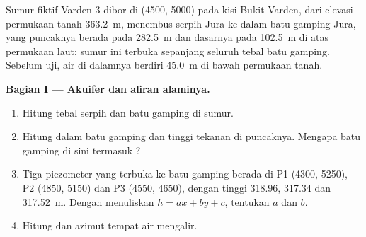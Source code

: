 \begin{problem}
\label{pb:b3:hydrogeology:1}
Sumur fiktif Varden-3 dibor di (4500, 5000) pada kisi
Bukit Varden, dari elevasi permukaan tanah \qty{363.2}{m}, menembus serpih Jura
ke dalam batu gamping Jura, yang puncaknya berada pada
\qty{282.5}{m} dan dasarnya pada \qty{102.5}{m} di atas permukaan laut; sumur ini terbuka
sepanjang seluruh tebal batu gamping. Sebelum uji, air di dalamnya
berdiri \qty{45.0}{m} di bawah permukaan tanah.

\medskip\noindent\textbf{Bagian I --- Akuifer dan aliran alaminya.}
\begin{enumerate}
\item Hitung tebal serpih dan batu gamping di sumur.
\item Hitung  dalam batu gamping dan tinggi tekanan di puncaknya.
  Mengapa batu gamping di sini termasuk ?
\item Tiga piezometer yang terbuka ke batu gamping berada di P1 (4300, 5250), P2
  (4850, 5150) dan P3 (4550, 4650), dengan tinggi \num{318.96}, \num{317.34} dan
  \qty{317.52}{m}. Dengan menuliskan $h = ax + by + c$, tentukan $a$ dan $b$.
\item Hitung  dan azimut tempat
  air mengalir.
\end{enumerate}


\end{problem}
